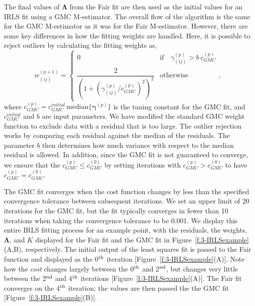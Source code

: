 The final values of $\bm{\Lambda}$ from the Fair fit are then used as the initial values for an IRLS fit using a GMC M-estimator.
The overall flow of the algorithm is the same for the GMC M-estimator as it was for the Fair M-estimator.
However, there are some key differences in how the fitting weights are handled.
Here, it is possible to reject outliers by calculating the fitting weights as,
\begin{equation}
  w_{(ij)}^{(p+1)} =
\begin{cases}
0 & \text{if} \quad \gamma_{(ij)}^{(p)} > b \ c_{GMC}^{(p)} \\
 \dfrac{2}{(1+(\gamma_{(ij)}^{(p)} / c_{GMC}^{(p)})^2)^2} & \text{otherwise}
\end{cases},
\end{equation}
where $c_{GMC}^{(p)} = c_{GMC}^{initial} \, \textrm{median}\{ \bm{\gamma}^{(p)} \}$ is the tuning constant for the GMC fit, and $c_{GMC}^{initial}$ and $b$ are input parameters.
We have modified the standard GMC weight function to exclude data with a residual that is too large.
The outlier rejection works by comparing each residual against the median of the residuals.
The parameter $b$ then determines how much variance with respect to the median residual is allowed.
In addition, since the GMC fit is not guaranteed to converge, we ensure that the $c_{GMC}^{(p)} \leq c_{GMC}^{(0)}$ by setting iterations with $c_{GMC}^{(p)} > c_{GMC}^{(0)}$ to have $c_{GMC}^{(p)} = c_{GMC}^{(0)}$.

The GMC fit converges when the cost function changes by less than the specified convergence tolerance between subsequent iterations.
We set an upper limit of 20 iterations for the GMC fit, but the fit typically converges in fewer than 10 iterations when taking the convergence tolerance to be 0.001.
We display this entire IRLS fitting process for an example point, with the residuals, the weights, $\bm{\Lambda}$, and $K$ displayed for the Fair fit and the GMC fit in Figure~\ref{f:3-IRLSexample}(A,B), respectively.
The initial output of the least squares fit is passed to the Fair function and displayed as the 0$^{\rm th}$ iteration [Figure~\ref{f:3-IRLSexample}(A)].
Note how the {\it cost} changes largely between the 0$^{\rm th}$ and 2$^{\rm nd}$, but changes very little between the 2$^{\rm nd}$ and 4$^{\rm th}$ iterations [Figure~\ref{f:3-IRLSexample}(A)].
The Fair fit converges on the 4$^{\rm th}$ iteration; the values are then passed the the GMC fit [Figure~\ref{f:3-IRLSexample}(B)].

